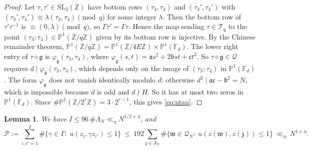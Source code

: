 \documentclass[11pt]{amsart}
\newtheorem{lemma}[theorem]{Lemma}
\theoremstyle{remark}
\theoremstyle{definition}
\numberwithin{equation}{section}
\newcommand{\Qc}{\mathcal{Q}}
\newcommand{\Tc}{\mathcal{T}}
\newcommand{\Pc}{\mathcal{P}}
\newcommand{\Z}{\mathbb{Z}}
\newcommand{\ga}{\mathfrak{a}}
\newcommand{\gb}{\mathfrak{b}}
\newcommand{\gc}{\mathfrak{c}}
\newcommand{\fg}{\mathfrak{g}}
\newcommand{\gz}{\mathfrak{z}}
\newcommand{\gw}{\mathfrak{w}}
\newcommand{\SL}{\mathrm{SL}}
\begin{document}
\begin{proof}
Let $\tau,\tau'\in\SL_2(\Z)$ have bottom rows $(\tau_3,\tau_4)$ and $(\tau_3',\tau_4')$ with $(\tau_3',\tau_4')\equiv\lambda(\tau_3,\tau_4)\pmod q$ for some integer $\lambda$. Then the bottom row of $\tau'\tau^{-1}$ is $\equiv(0,\lambda)\pmod q$, so $\Gamma\tau'=\Gamma\tau$. Hence the map sending $\tau\in\Tc_q$ to the point $(\tau_3:\tau_4)\in\mathbb P^1(\Z/q\Z)$ given by its bottom row is injective. By the Chinese remainder theorem, $\mathbb P^1(\Z/q\Z)=\mathbb P^1(\Z/4E\Z)\times\mathbb P^1(\mathbb F_d)$. The lower right entry of $\tau\diamond\fg$ is $\varphi_\fg(\tau_3,\tau_4)$, where $\varphi_\fg(s,t)=\ga s^2+2\gb st+\gc t^2$. So $\tau\diamond\fg\in\Qc$ requires $d\mid\varphi_\fg(\tau_3,\tau_4)$, which depends only on the image of $(\tau_3:\tau_4)$ in $\mathbb P^1(\mathbb F_d)$. The form $\varphi_\fg$ does not vanish identically modulo $d$: otherwise $d^2\mid\ga\gc-\gb^2=N$, which is impossible because $d$ is odd and $d\nmid H$. So it has at most two zeros in $\mathbb P^1(\mathbb F_d)$. Since $\#\mathbb P^1(\Z/2^r\Z)=3\cdot2^{r-1}$, this gives \eqref{eq:ntau}.
\end{proof}

\begin{lemma}\label{lem:pairs}
We have $I\le96\,\#\Lambda_N\ll_\eta N^{1/2+\eta}$, and
\[
\Pc:=\sum_{i,i'=1}^I\#\{\gamma\in\Gamma:\ u(z_i,\gamma z_{i'})\le1\}\ \le\ 192\sum_{\gz\in\Lambda_N}\#\{\gw\in\Qc_N:\ u(z(\gw),z(\gz))\le1\}\ \ll_\eta\ N^{1+\eta}.
\]
\end{lemma}
\end{document}
